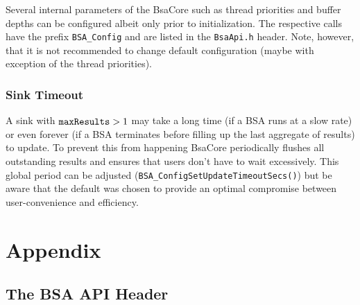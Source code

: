\documentclass[11pt]{article}
\newcommand{\bsac}{BsaCore}
\newcommand{\bsa} {BSA}
\newcommand{\cod}[1]{{\tt#1}}
\begin{document}
Several internal parameters of the \bsac{} such as thread priorities
and buffer depths can be configured albeit only prior to initialization.
The respective calls have the prefix \cod{BSA\_Config} and are listed
in the \cod{BsaApi.h} header. Note, however, that it is not recommended
to change default configuration (maybe with exception of the thread
priorities).

\subsubsection{Sink Timeout}
A sink with $\cod{maxResults} >1$ may take a long time (if a \bsa{} runs
at a slow rate) or even forever (if a \bsa{} terminates before filling up
the last aggregate of results) to update. To prevent this from happening
\bsac{} periodically flushes all outstanding results and ensures that
users don't have to wait excessively. This global period can be adjusted
(\cod{BSA\_ConfigSetUpdateTimeoutSecs()}) but be aware that the default was
chosen to provide an optimal compromise between user-convenience and efficiency.
\appendix
\pagebreak
\section*{Appendix}

\subsection*{The \bsa{} API Header}
\label{app:api}

\end{document}
